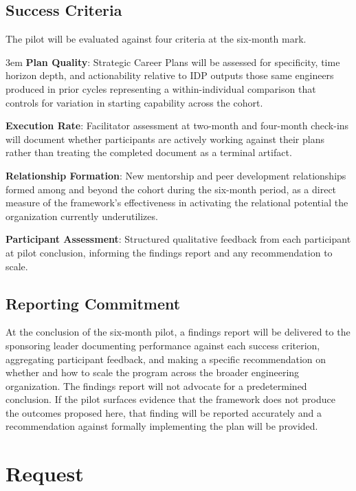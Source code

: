 \documentclass{article}
\begin{document}
\subsection{Success Criteria}

The pilot will be evaluated against four criteria at the six-month mark.


\begin{addmargin}[2em]{3em}
\textbf{Plan Quality}: Strategic Career Plans will be assessed for specificity,
time horizon depth, and actionability relative to IDP outputs those same
engineers produced in prior cycles representing a within-individual comparison that
controls for variation in starting capability across the cohort.

\textbf{Execution Rate}: Facilitator assessment at two-month and
four-month check-ins will document whether participants are actively working
against their plans rather than treating the completed document as a terminal
artifact.

\textbf{Relationship Formation}: New mentorship and peer development
relationships formed among and beyond the cohort during the six-month period,
as a direct measure of the framework's effectiveness in activating the
relational potential the organization currently underutilizes.

\textbf{Participant Assessment}: Structured qualitative feedback from each
participant at pilot conclusion, informing the findings report and any
recommendation to scale.
\end{addmargin}


\subsection{Reporting Commitment}

At the conclusion of the six-month pilot, a findings report will be delivered
to the sponsoring leader documenting performance against each success criterion,
aggregating participant feedback, and making a specific recommendation on
whether and how to scale the program across the broader 
engineering organization. The findings report will not advocate for a
predetermined conclusion. If the pilot surfaces evidence that the framework
does not produce the outcomes proposed here, that finding will be reported
accurately and a recommendation against formally implementing the plan will be
provided.

\section{Request}
\end{document}
